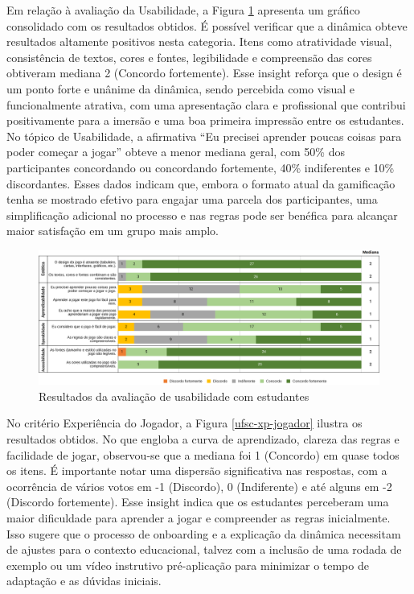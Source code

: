 \documentclass[
	12pt,
	openright,
	twoside,
	a4paper,
	english,
	brazil
	]{abntex2}
\begin{document}
Em relação à avaliação da Usabilidade, a Figura \ref{ufsc-usabilidade} apresenta um gráfico consolidado com os resultados obtidos. É possível verificar que a dinâmica obteve resultados altamente positivos nesta categoria. Itens como atratividade visual, consistência de textos, cores e fontes, legibilidade e compreensão das cores obtiveram mediana 2 (Concordo fortemente). Esse insight reforça que o design é um ponto forte e unânime da dinâmica, sendo percebida como visual e funcionalmente atrativa, com uma apresentação clara e profissional que contribui positivamente para a imersão e uma boa primeira impressão entre os estudantes. No tópico de Usabilidade, a afirmativa  “Eu precisei aprender poucas coisas para poder começar a jogar” obteve a menor mediana geral, com 50\% dos participantes concordando ou concordando fortemente, 40\% indiferentes e 10\% discordantes. Esses dados indicam que, embora o formato atual da gamificação tenha se mostrado efetivo para engajar uma parcela dos participantes, uma simplificação adicional no processo e nas regras pode ser benéfica para alcançar maior satisfação em um grupo mais amplo.

\begin{figure}[H]
	\caption{\label{ufsc-usabilidade} Resultados da avaliação de usabilidade com estudantes}
  \includegraphics[width=\textwidth]{ufsc-usabilidade}
\end{figure}


No critério Experiência do Jogador, a Figura \ref{ufsc-xp-jogador} ilustra os resultados obtidos. No que engloba a curva de aprendizado, clareza das regras e facilidade de jogar, observou-se que a mediana foi 1 (Concordo) em quase todos os itens. É importante notar uma dispersão significativa nas respostas, com a ocorrência de vários votos em -1 (Discordo), 0 (Indiferente) e até alguns em -2 (Discordo fortemente). Esse insight indica que os estudantes perceberam uma maior dificuldade para aprender a jogar e compreender as regras inicialmente. Isso sugere que o processo de onboarding e a explicação da dinâmica necessitam de ajustes para o contexto educacional, talvez com a inclusão de uma rodada de exemplo ou um vídeo instrutivo pré-aplicação para minimizar o tempo de adaptação e as dúvidas iniciais.
\end{document}
